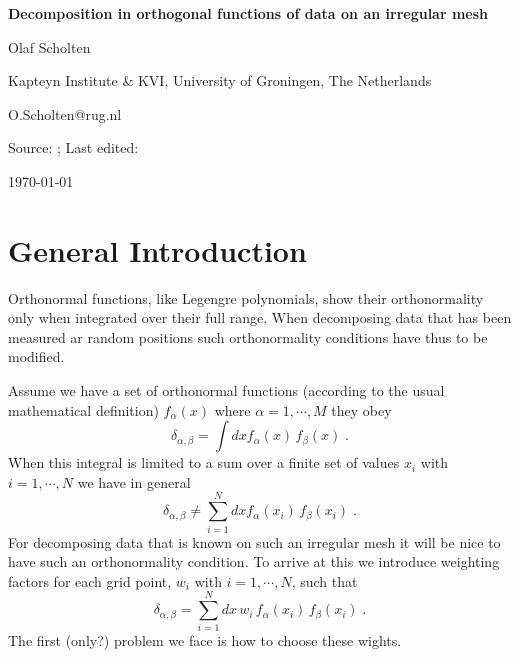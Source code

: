 \documentclass[fleqn,11pt]{article}
\def\beq{\begin{equation}}
\def\eeq{\end{equation}}
\def\eqlab#1{\label{eq:#1}}
\newcommand*{\FileDate}[1]{\expandafter\filedateX\pdffilemoddate{#1}\relax}
\def\filedateX#1#2#3#4#5#6#7#8{%
\filedateXX{#3#4#5#6}{#7#8}}
\def\filedateXX#1#2#3#4#5#6#7#8{%
\filedateXXX{#1}{#2}{#3#4}{#5#6}{#7#8}}
\def\filedateXXX#1#2#3#4#5#6#7#8\relax{\formatdate{#1}{#2}{#3}{#4}{#5}{#6#7}}
\newcommand*{\formatdate}[6]{#1-#2-#3\ #4:#5:#6}
\begin{document}
\centerline{\LARGE \bf Decomposition in orthogonal functions of data on an irregular mesh }\vspace{2ex}
\centerline{Olaf Scholten}\vspace{2ex}
\centerline{Kapteyn Institute \& KVI, University of Groningen, The Netherlands}\vspace{2ex}
\centerline{O.Scholten@rug.nl}\vspace{2ex}
\centerline{Source: \texttt{\jobname}; \hspace{3ex}
Last edited: \FileDate{\jobname.tex} }\vspace{15ex}



\hfill \today

\section{General Introduction}

Orthonormal functions, like Legengre polynomials, show their orthonormality only when integrated over their full range. When decomposing data that has been measured ar random positions such orthonormality conditions have thus to be modified.

Assume we have a set of orthonormal functions (according to the usual mathematical definition) $f_\alpha(x)$ where $\alpha=1, \cdots ,M$ they obey
\beq
\delta_{\alpha,\beta} =\int dx f_\alpha(x) \, f_\beta(x) \;.
\eeq
When this integral is limited to a sum over a finite set of values $x_i$ with $i=1, \cdots ,N$ we have in general
\beq
\delta_{\alpha,\beta} \neq \sum_{i=1}^N dx f_\alpha(x_i) \, f_\beta(x_i) \;.
\eeq
For decomposing data that is known on such an irregular mesh it will be nice to have such an orthonormality condition. To arrive at this we introduce weighting factors for each grid point, $w_i$ with $i=1, \cdots ,N$, such that
\beq
\delta_{\alpha,\beta} = \sum_{i=1}^N dx \,w_i\,f_\alpha(x_i) \, f_\beta(x_i) \;. \eqlab{Norm1}
\eeq
The first (only?) problem we face is how to choose these wights.
\end{document}
